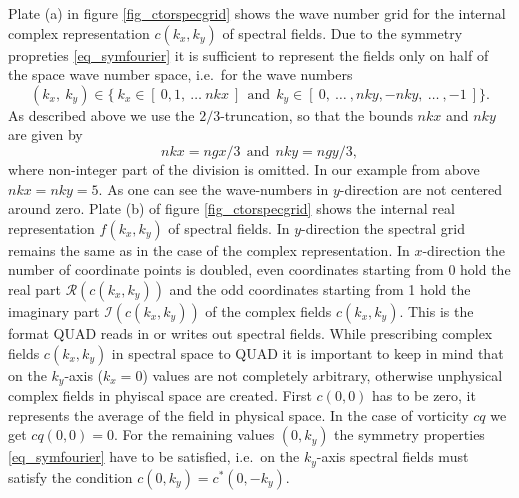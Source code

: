 Plate (a) in figure \ref{fig_ctorspecgrid} shows the wave number
grid for the internal complex representation $c(k_{x},k_{y})$ 
of spectral fields. Due to the symmetry propreties 
\ref{eq_symfourier} it is sufficient to represent the fields only 
on half of the space wave number space, i.e.\ for the wave numbers 
\begin{equation} \label{eq_ncentwgrid}
   (k_{x},\ k_{y}) \in  
   \{\ k_{x} \in [\ 0,1,\ \dots \ nkx \ ] \ \ \mbox{and} \ \ 
   k_{y} \in [\ 0, \ \dots \ ,nky,-nky, \ \dots \ , -1 \ ] \}.
\end{equation}
As described above we use the $2/3$-truncation, so that the bounds 
$nkx$ and $nky$ are given by  
\begin{equation} \label{eq_nkxnky}
   nkx = ngx/3 \ \ \mbox{and} \ \ nky = ngy/3,
\end{equation}
where non-integer part of the division is omitted. In our example from 
above $nkx = nky = 5$. As one can see the wave-numbers 
in $y$-direction are not centered around zero. Plate (b) of 
figure \ref{fig_ctorspecgrid} shows the internal real representation 
$f(k_{x},k_{y})$ of spectral fields. In $y$-direction the spectral 
grid remains the same as in the case of the complex representation. 
In $x$-direction the number of coordinate points is doubled, even 
coordinates starting from 
$0$ hold the real part $\mathcal{R}(c(k_{x},k_{y}))$ and       
the odd coordinates starting from 1 hold the imaginary part 
$\mathcal{I}(c(k_{x},k_{y}))$ of the complex fields $c(k_{x},k_{y})$. 
This is the format QUAD reads in or writes out spectral fields.
While prescribing complex fields $c(k_{x},k_{y})$ in spectral space
to QUAD it is important to keep in mind that on the $k_{y}$-axis 
($k_{x} = 0$) values are not completely arbitrary, otherwise unphysical
complex fields in phyiscal space are created. First $c(0,0)$ has
to be zero, it represents the average of the field in physical space.
In the case of vorticity $cq$ we get $cq(0,0) = 0$. For the remaining
values $(0,k_{y})$ the symmetry properties \ref{eq_symfourier} have
to be satisfied, i.e.\ on the $k_{y}$-axis spectral fields must
satisfy the condition $c(0,k_{y}) = c^{*}(0,-k_{y})$.
